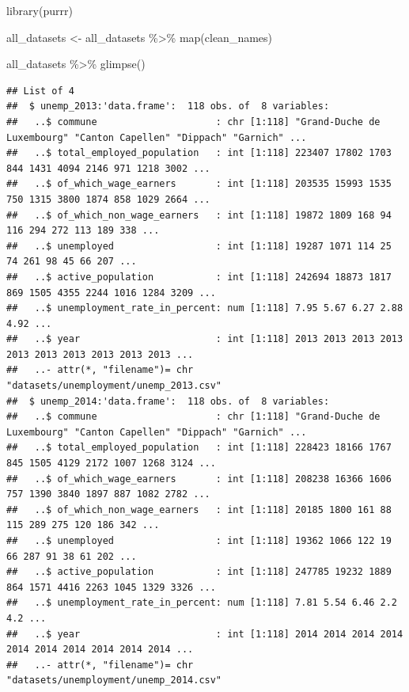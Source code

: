 \documentclass[
]{article}
\newenvironment{Shaded}{\begin{snugshade}}{\end{snugshade}}
\newcommand{\FunctionTok}[1]{\textcolor[rgb]{0.00,0.00,0.00}{#1}}
\newcommand{\NormalTok}[1]{#1}
\newcommand{\OtherTok}[1]{\textcolor[rgb]{0.56,0.35,0.01}{#1}}
\newcommand{\SpecialCharTok}[1]{\textcolor[rgb]{0.00,0.00,0.00}{#1}}
\begin{document}
\begin{Shaded}
\begin{Highlighting}[]
\FunctionTok{library}\NormalTok{(purrr)}

\NormalTok{all\_datasets }\OtherTok{\textless{}{-}}\NormalTok{ all\_datasets }\SpecialCharTok{\%\textgreater{}\%}
  \FunctionTok{map}\NormalTok{(clean\_names)}

\NormalTok{all\_datasets }\SpecialCharTok{\%\textgreater{}\%}
  \FunctionTok{glimpse}\NormalTok{()}
\end{Highlighting}
\end{Shaded}

\begin{verbatim}
## List of 4
##  $ unemp_2013:'data.frame':  118 obs. of  8 variables:
##   ..$ commune                     : chr [1:118] "Grand-Duche de Luxembourg" "Canton Capellen" "Dippach" "Garnich" ...
##   ..$ total_employed_population   : int [1:118] 223407 17802 1703 844 1431 4094 2146 971 1218 3002 ...
##   ..$ of_which_wage_earners       : int [1:118] 203535 15993 1535 750 1315 3800 1874 858 1029 2664 ...
##   ..$ of_which_non_wage_earners   : int [1:118] 19872 1809 168 94 116 294 272 113 189 338 ...
##   ..$ unemployed                  : int [1:118] 19287 1071 114 25 74 261 98 45 66 207 ...
##   ..$ active_population           : int [1:118] 242694 18873 1817 869 1505 4355 2244 1016 1284 3209 ...
##   ..$ unemployment_rate_in_percent: num [1:118] 7.95 5.67 6.27 2.88 4.92 ...
##   ..$ year                        : int [1:118] 2013 2013 2013 2013 2013 2013 2013 2013 2013 2013 ...
##   ..- attr(*, "filename")= chr "datasets/unemployment/unemp_2013.csv"
##  $ unemp_2014:'data.frame':  118 obs. of  8 variables:
##   ..$ commune                     : chr [1:118] "Grand-Duche de Luxembourg" "Canton Capellen" "Dippach" "Garnich" ...
##   ..$ total_employed_population   : int [1:118] 228423 18166 1767 845 1505 4129 2172 1007 1268 3124 ...
##   ..$ of_which_wage_earners       : int [1:118] 208238 16366 1606 757 1390 3840 1897 887 1082 2782 ...
##   ..$ of_which_non_wage_earners   : int [1:118] 20185 1800 161 88 115 289 275 120 186 342 ...
##   ..$ unemployed                  : int [1:118] 19362 1066 122 19 66 287 91 38 61 202 ...
##   ..$ active_population           : int [1:118] 247785 19232 1889 864 1571 4416 2263 1045 1329 3326 ...
##   ..$ unemployment_rate_in_percent: num [1:118] 7.81 5.54 6.46 2.2 4.2 ...
##   ..$ year                        : int [1:118] 2014 2014 2014 2014 2014 2014 2014 2014 2014 2014 ...
##   ..- attr(*, "filename")= chr "datasets/unemployment/unemp_2014.csv"

\end{verbatim}
\end{document}
